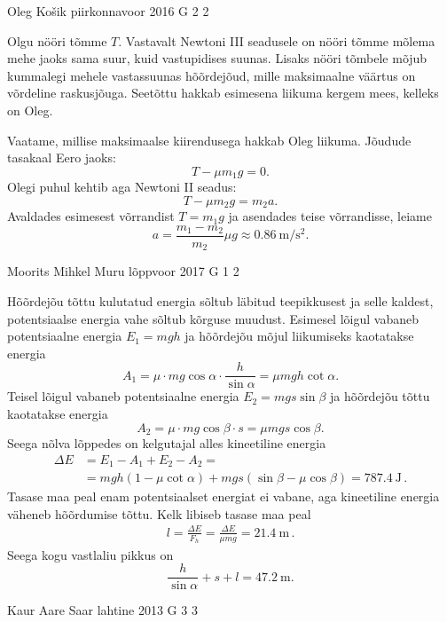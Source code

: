 \documentclass[11pt]{article}
\begin{document}
{%
{Oleg Košik} %
{piirkonnavoor} %
{2016} %
{G 2} %
{2} %
{

\ifSolution
Olgu nööri tõmme $T$. Vastavalt Newtoni III seadusele on nööri tõmme mõlema mehe jaoks sama suur, kuid vastupidises suunas. Lisaks nööri tõmbele mõjub kummalegi mehele vastassuunas hõõrdejõud, mille maksimaalne väärtus on võrdeline raskusjõuga. Seetõttu hakkab esimesena liikuma kergem mees, kelleks on Oleg.

Vaatame, millise maksimaalse kiirendusega hakkab Oleg liikuma.
Jõudude tasakaal Eero jaoks:
\[
T-\mu m_1g = 0.
\]
Olegi puhul kehtib aga Newtoni II seadus:
\[
T-\mu m_2g = m_2a.
\]
Avaldades esimesest võrrandist $T=m_1g$ ja asendades teise võrrandisse, leiame
\[
a = \frac{m_1-m_2}{m_2}\mu g \approx \SI{0,86}{\meter \per \second\squared}.
\]
\fi
}

{Moorits Mihkel Muru} %
{lõppvoor} %
{2017} %
{G 1} %
{2} %
{

\ifSolution
Hõõrdejõu tõttu kulutatud energia sõltub läbitud teepikkusest ja selle kaldest, potentsiaalse energia vahe sõltub kõrguse muudust. Esimesel lõigul vabaneb potentsiaalne energia \(E_1 = mgh\) ja hõõrdejõu mõjul liikumiseks kaotatakse energia
\[
A_1 = \mu \cdot mg\cos\alpha \cdot \frac{h}{\sin\alpha} = \mu mgh \cot\alpha.
\]
Teisel lõigul vabaneb potentsiaalne energia \(E_2 = mgs \sin\beta\) ja hõõrdejõu tõttu kaotatakse energia
\[
A_2 = \mu \cdot mg \cos \beta \cdot s = \mu mgs \cos \beta.
\]
Seega nõlva lõppedes on kelgutajal alles kineetiline energia
\begin{align*}
\Delta E &= E_1 - A_1 + E_2 - A_2 = \\
&= mgh(1-\mu\cot\alpha) + mgs(\sin\beta - \mu\cos\beta) = \SI{787.4}{\joule} \, .
\end{align*}
Tasase maa peal enam potentsiaalset energiat ei vabane, aga kineetiline energia väheneb hõõrdumise tõttu. Kelk libiseb tasase maa peal
\begin{align*}
l = \frac{\Delta E}{F_h} = \frac{\Delta E}{\mu mg} = \SI{21.4}{\meter} \, .
\end{align*}
Seega kogu vastlaliu pikkus on
\[
\frac{h}{\sin\alpha} + s + l = \SI{47.2}{\meter}.
\]
\fi
}

{Kaur Aare Saar} %
{lahtine} %
{2013} %
{G 3} %
{3} %
{

}}
\end{document}
